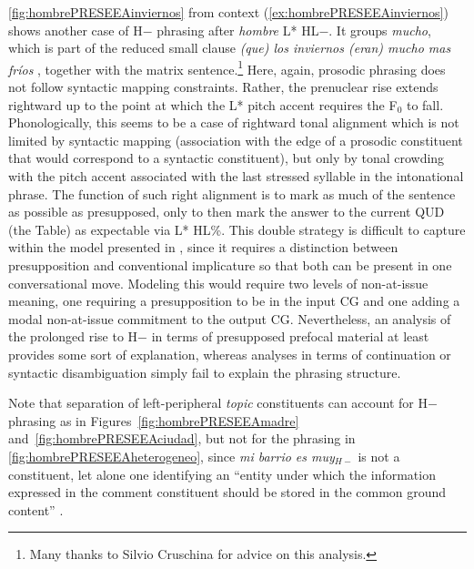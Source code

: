 \autoref{fig:hombrePRESEEAinviernos} from context (\ref{ex:hombrePRESEEAinviernos}) shows another case of H$-$ phrasing after \textit{hombre} L* HL$-$. It groups \textit{mucho}, which is part of the reduced small clause \textit{(que) los inviernos (eran) mucho mas fríos} \citep[239--294]{Stowell.1981}, together with the matrix sentence.\footnote{Many thanks to Silvio Cruschina for advice on this analysis.} Here, again, prosodic phrasing does not follow syntactic mapping constraints. Rather, the prenuclear rise extends rightward up to the point at which the L* pitch accent requires the F$_0$ to fall. Phonologically, this seems to be a case of rightward tonal alignment which is not limited by syntactic mapping (association with the edge of a prosodic constituent that would correspond to a syntactic constituent), but only by tonal crowding with the pitch accent associated with the last stressed syllable in the intonational phrase. The function of such right alignment is to mark as much of the sentence as possible as presupposed, only to then mark the answer to the current \ac{QUD} (the Table) as expectable via L* HL\%. This double strategy is difficult to capture within the model presented in , since it requires a distinction between presupposition and conventional implicature so that both can be present in one conversational move. Modeling this would require two levels of non-at-issue meaning, one requiring a presupposition to be in the input \ac{CG} and one adding a modal non-at-issue commitment to the output \ac{CG}. Nevertheless, an analysis of the prolonged rise to H$-$ in terms of presupposed prefocal material at least provides some sort of explanation, whereas analyses in terms of continuation or syntactic disambiguation simply fail to explain the phrasing structure.

Note that separation of left-peripheral \textit{topic} constituents can account for H$-$ phrasing as in Figures~\ref{fig:hombrePRESEEAmadre} and~\ref{fig:hombrePRESEEAciudad}, but not for the phrasing in \autoref{fig:hombrePRESEEAheterogeneo}, since \textit{mi barrio es muy$_{H-}$} is not a constituent, let alone one identifying an ``entity under which the information expressed in the comment constituent should be stored in the common ground content'' \citep[28]{KrifkaMusan.2012}.


